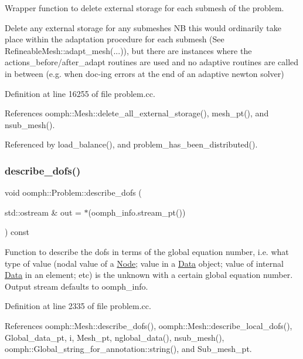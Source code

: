 Wrapper function to delete external storage for each submesh of the problem. 

Delete any external storage for any submeshes NB this would ordinarily take place within the adaptation procedure for each submesh (See Refineable\+Mesh\+::adapt\+\_\+mesh(...)), but there are instances where the actions\+\_\+before/after\+\_\+adapt routines are used and no adaptive routines are called in between (e.\+g. when doc-\/ing errors at the end of an adaptive newton solver) 

Definition at line 16255 of file problem.\+cc.



References oomph\+::\+Mesh\+::delete\+\_\+all\+\_\+external\+\_\+storage(), mesh\+\_\+pt(), and nsub\+\_\+mesh().



Referenced by load\+\_\+balance(), and problem\+\_\+has\+\_\+been\+\_\+distributed().

\mbox{\label{classoomph_1_1Problem_abc103804eb319ae0b3d43870cc3e1eaf}} 
\subsubsection{\texorpdfstring{describe\+\_\+dofs()}{describe\_dofs()}}
{\footnotesize\ttfamily void oomph\+::\+Problem\+::describe\+\_\+dofs (\begin{DoxyParamCaption}\item[{std\+::ostream \&}]{out = {\ttfamily $\ast$(oomph\+\_\+info.stream\+\_\+pt())} }\end{DoxyParamCaption}) const}



Function to describe the dofs in terms of the global equation number, i.\+e. what type of value (nodal value of a \hyperlink{classoomph_1_1Node}{Node}; value in a \hyperlink{classoomph_1_1Data}{Data} object; value of internal \hyperlink{classoomph_1_1Data}{Data} in an element; etc) is the unknown with a certain global equation number. Output stream defaults to oomph\+\_\+info. 



Definition at line 2335 of file problem.\+cc.



References oomph\+::\+Mesh\+::describe\+\_\+dofs(), oomph\+::\+Mesh\+::describe\+\_\+local\+\_\+dofs(), Global\+\_\+data\+\_\+pt, i, Mesh\+\_\+pt, nglobal\+\_\+data(), nsub\+\_\+mesh(), oomph\+::\+Global\+\_\+string\+\_\+for\+\_\+annotation\+::string(), and Sub\+\_\+mesh\+\_\+pt.



